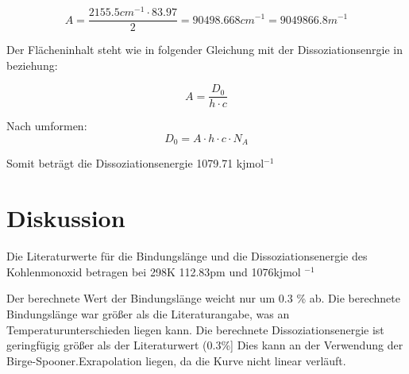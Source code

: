\documentclass[12pt]{article}
\begin{document}
\begin{equation}
    A = \frac{2155.5cm^{-1} \cdot 83.97}{2} = 90498.668cm^{-1} = 9049866.8 m^{-1}
\end{equation}

Der Flächeninhalt steht wie in folgender Gleichung mit der Dissoziationsenrgie in beziehung:

\begin{equation}
    A = \frac{D_0}{h\cdot c}
\end{equation}

Nach umformen:
\begin{equation}
    D_0 = A \cdot h \cdot c \cdot N_A
\end{equation}

Somit beträgt die Dissoziationsenergie 1079.71 kjmol$^{-1}$

\section{Diskussion}

Die Literaturwerte für die Bindungslänge und die Dissoziationsenergie des Kohlenmonoxid betragen bei 298K 112.83pm \supercite{atkins} und 1076kjmol $^{-1}$ ~\supercite{atkins}

Der berechnete Wert der Bindungslänge weicht nur um 0.3 \% ab. Die berechnete Bindungslänge war größer als die Literaturangabe, was an Temperaturunterschieden liegen kann. Die berechnete Dissoziationsenergie ist geringfügig größer als der Literaturwert (0.3\%]  Dies kann an der Verwendung der Birge-Spooner.Exrapolation liegen, da die Kurve nicht linear verläuft.

\printbibliography
\end{document}
